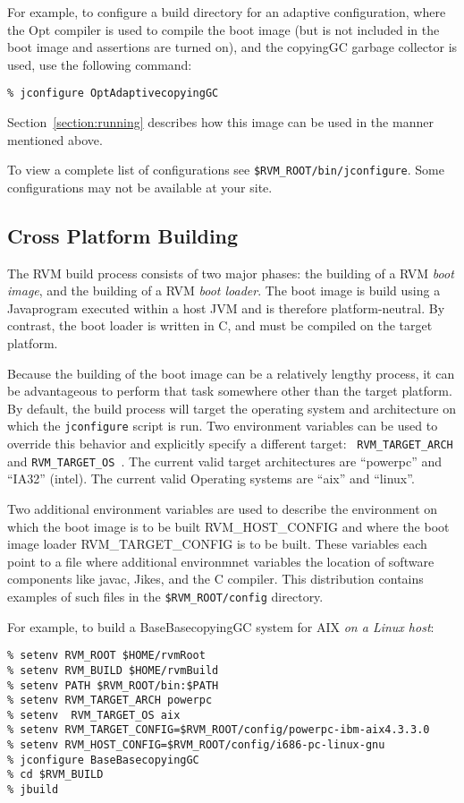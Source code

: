 For example, to configure a build 
directory for an adaptive configuration, where the Opt compiler is 
used to compile the boot image (but is not included in the boot image
and assertions are turned on), and the copyingGC garbage collector is
used, use the following command:

\begin{verbatim}
% jconfigure OptAdaptivecopyingGC
\end{verbatim}

Section~\ref{section:running} describes how this image can be used in
the manner mentioned above.

To view a complete list of configurations see 
{\tt \$RVM\_ROOT/bin/jconfigure}.
Some configurations may not be available at your site. 

\subsection{Cross Platform Building}

The RVM build process consists of two major phases: the building of a
RVM {\em boot image}, and the building of a RVM {\em boot loader}.
The boot image is build using a Java\trademark program executed within a host
JVM and is therefore platform-neutral.  By contrast, the boot loader
is written in C, and must be compiled on the target platform.

Because the building of the boot image can be a relatively lengthy
process, it can be advantageous to perform that task somewhere other
than the target platform.  By default, the build process will target
the operating system and architecture on which the {\tt jconfigure}
script is run.  
    Two environment variables can be used to
override this behavior and explicitly specify a different target: {\tt
  RVM\_TARGET\_ARCH } and {\tt RVM\_TARGET\_OS }. The current valid target
architectures are ``powerpc'' and ``IA32'' (intel). The current valid
Operating systems are ``aix'' and ``linux''.

    Two additional environment variables are used to describe the 
environment on which the boot image is to be built RVM\_HOST\_CONFIG  and where
the boot image loader  RVM\_TARGET\_CONFIG is to be built. These variables
each point to a file where additional environmnet variables the location
of software components like javac, Jikes\trademark, and the C compiler. This distribution
contains examples of such files in the {\tt \$RVM\_ROOT/config} directory.   

For example, to build a BaseBasecopyingGC system for AIX {\em on a Linux
host}:
\begin{verbatim}
% setenv RVM_ROOT $HOME/rvmRoot
% setenv RVM_BUILD $HOME/rvmBuild
% setenv PATH $RVM_ROOT/bin:$PATH
% setenv RVM_TARGET_ARCH powerpc
% setenv  RVM_TARGET_OS aix
% setenv RVM_TARGET_CONFIG=$RVM_ROOT/config/powerpc-ibm-aix4.3.3.0
% setenv RVM_HOST_CONFIG=$RVM_ROOT/config/i686-pc-linux-gnu
% jconfigure BaseBasecopyingGC
% cd $RVM_BUILD
% jbuild
\end{verbatim}

